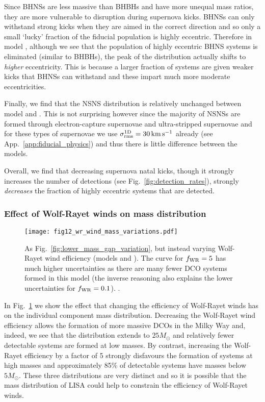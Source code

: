 Since BHNSs are less massive than BHBHs and have more unequal mass ratios, they are more vulnerable to disruption during supernova kicks. BHNSs can only withstand strong kicks when they are aimed in the correct direction and so only a small `lucky' fraction of the fiducial population is highly eccentric. Therefore in model \modSigLower{}, although we see that the population of highly eccentric BHNS systems is eliminated (similar to BHBHs), the peak of the distribution actually shifts to \textit{higher} eccentricity. This is because a larger fraction of systems are given weaker kicks that BHNSs can withstand and these impart much more moderate eccentricities.

Finally, we find that the NSNS distribution is relatively unchanged between model \modFid{} and \modSigLower{}. This is not surprising however since the majority of NSNSs are formed through electron-capture supernovae and ultra-stripped supernovae and for these types of supernovae we use $\sigma^{\rm 1D}_{\rm rms} = 30 \unit{km}{s^{-1}}$ already (see App.~\ref{app:fiducial_physics}) and thus there is little difference between the models.

Overall, we find that decreasing supernova natal kicks, though it strongly increases the number of detections (see Fig.~\ref{fig:detection_rates}), strongly \textit{decreases} the fraction of highly eccentric systems that are detected.

\subsubsection{Effect of Wolf-Rayet winds on mass distribution}

\begin{figure}[tb]
    \centering
    \texttt{[image: fig12\_wr\_wind\_mass\_variations.pdf]}
    \caption{As Fig.~\ref{fig:lower_mass_gap_variation}, but instead varying Wolf-Rayet wind efficiency (models \modWRLow{} and \modWRHigh{}). The curve for $f_{\rm WR} = 5$ has much higher uncertainties as there are many fewer DCO systems formed in this model (the inverse reasoning also explains the lower uncertainties for $f_{\rm WR} = 0.1$). \href{https://github.com/TomWagg/detecting-DCOs-in-LISA/blob/main/paper/figures/fig12_wr_wind_mass_variations.pdf}{\faFileImage} \href{https://github.com/TomWagg/detecting-DCOs-in-LISA/blob/main/paper/figure_notebooks/variations.ipynb}{\faBook}.}
    \label{fig:wr_wind_mass_variations}
\end{figure}

In Fig.~\ref{fig:wr_wind_mass_variations} we show the effect that changing the efficiency of Wolf-Rayet winds has on the individual component mass distribution. Decreasing the Wolf-Rayet wind efficiency allows the formation of more massive DCOs in the Milky Way and, indeed, we see that the distribution extends to $25 \unit{M_{\odot}}$ and relatively fewer detectable systems are formed at low masses. By contrast, increasing the Wolf-Rayet efficiency by a factor of 5 strongly disfavours the formation of systems at high masses and approximately 85\% of detectable systems have masses below $5 \unit{M_{\odot}}$. These three distributions are very distinct and so it is possible that the mass distribution of LISA could help to constrain the efficiency of Wolf-Rayet winds.
